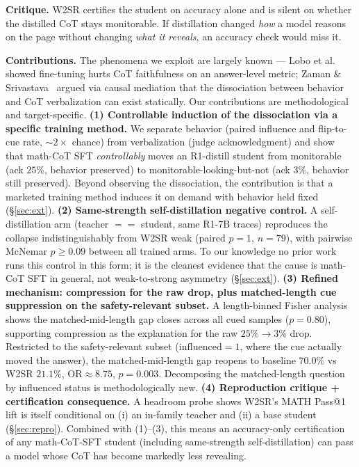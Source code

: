 \documentclass[10pt]{article}
\begin{document}
\textbf{Critique.} W2SR certifies the student on accuracy alone and is silent on
whether the distilled CoT stays monitorable. If distillation changed \emph{how} a
model reasons on the page without changing \emph{what it reveals}, an accuracy
check would miss it.

\textbf{Contributions.} The phenomena we exploit are largely known --- Lobo
et al.~\cite{lobo2024} showed fine-tuning hurts CoT faithfulness on an
answer-level metric; Zaman \& Srivastava~\cite{zaman2025} argued via causal
mediation that the dissociation between behavior and CoT verbalization can exist
statically. Our contributions are methodological and target-specific.
\textbf{(1) Controllable induction of the dissociation via a specific training
method.} We separate behavior (paired influence and flip-to-cue rate, $\sim
2\times$ chance) from verbalization (judge acknowledgment) and show that
math-CoT SFT \emph{controllably} moves an R1-distill student from monitorable
(ack $25\%$, behavior preserved) to monitorable-looking-but-not (ack $3\%$,
behavior still preserved). Beyond observing the dissociation, the contribution
is that a marketed training method induces it on demand with behavior held
fixed (\S\ref{sec:ext}).
\textbf{(2) Same-strength self-distillation negative control.} A
self-distillation arm (teacher $==$ student, same R1-7B traces) reproduces the
collapse indistinguishably from W2SR weak (paired $p\!=\!1$, $n\!=\!79$), with
pairwise McNemar $p\!\ge\!0.09$ between all trained arms. To our knowledge no
prior work runs this control in this form; it is the cleanest evidence that the
cause is math-CoT SFT in general, not weak-to-strong asymmetry (\S\ref{sec:ext}).
\textbf{(3) Refined mechanism: compression for the raw drop, plus matched-length
cue suppression on the safety-relevant subset.} A length-binned Fisher analysis
shows the matched-mid-length gap closes across all cued samples
($p\!=\!0.80$), supporting compression as the explanation for the raw
$25\%\!\to\!3\%$ drop. Restricted to the safety-relevant subset
($\mathrm{influenced}\!=\!1$, where the cue actually moved the answer), the
matched-mid-length gap reopens to baseline $70.0\%$ vs W2SR $21.1\%$,
$\mathrm{OR}\!\approx\!8.75$, $p\!=\!0.003$. Decomposing the matched-length
question by influenced status is methodologically new.
\textbf{(4) Reproduction critique + certification consequence.} A headroom probe
shows W2SR's MATH Pass@1 lift is itself conditional on (i) an in-family teacher
and (ii) a base student (\S\ref{sec:repro}). Combined with (1)--(3), this means
an accuracy-only certification of any math-CoT-SFT student (including
same-strength self-distillation) can pass a model whose CoT has become markedly
less revealing.
\end{document}

